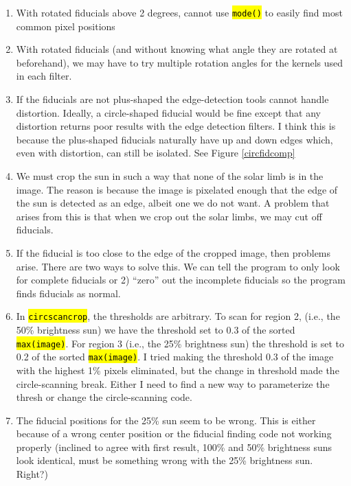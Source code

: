 \documentclass[10pt]{scrartcl}
\begin{document}
    \begin{enumerate}
        \item With rotated fiducials above 2 degrees, cannot use \hl{\texttt{mode()}} to easily find most common pixel positions
        \item With rotated fiducials (and without knowing what angle they are rotated at beforehand), we may have to try multiple rotation angles for the kernels used in each filter.
        \item If the fiducials are not plus-shaped the edge-detection tools cannot handle distortion. Ideally, a circle-shaped fiducial would be fine except that any distortion returns poor results with the edge detection filters. I think this is because the plus-shaped fiducials naturally have up and down edges which, even with distortion, can still be isolated. See Figure \ref{circfidcomp}
        \item We must crop the sun in such a way that none of the solar limb is in the image. The reason is because the image is pixelated enough that the edge of the sun is detected as an edge, albeit one we do not want. A problem that arises from this is that when we crop out the solar limbs, we may cut off fiducials.
        \item If the fiducial is too close to the edge of the cropped image, then problems arise. There are two ways to solve this. We can tell the program to only look for complete fiducials or 2) ``zero'' out the incomplete fiducials so the program finds fiducials as normal.
        \item In \hl{\texttt{circscancrop}}, the thresholds are arbitrary. To scan for region 2, (i.e., the 50\% brightness sun) we have the threshold set to 0.3 of the sorted \hl{\texttt{max(image)}}. For region 3 (i.e., the 25\% brightness sun) the threshold is set to 0.2 of the sorted \hl{\texttt{max(image)}}. I tried making the threshold 0.3 of the image with the highest 1\% pixels eliminated, but the change in threshold made the circle-scanning break. Either I need to find a new way to parameterize the thresh or change the circle-scanning code. 
        \item The fiducial positions for the 25\% sun seem to be wrong. This is either because of a wrong center position or the fiducial finding code not working properly (inclined to agree with first result, 100\% and 50\% brightness suns look identical, must be something wrong with the 25\% brightness sun. Right?)
    \end{enumerate}
\end{document}
